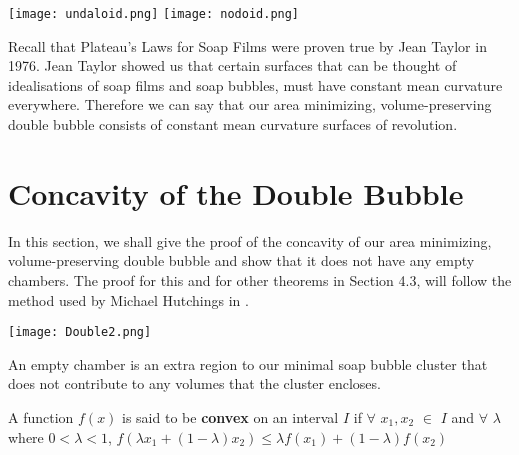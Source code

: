 \documentclass[a4paper,12pt]{report}
\begin{document}
\begin{center}
\texttt{[image: undaloid.png]}
\hspace{1cm}
\texttt{[image: nodoid.png]}
\vspace{-1cm}
\begin{multicols}{2}
\vspace{1cm}
\end{multicols}
\end{center}

Recall that Plateau's Laws for Soap Films were proven true by Jean Taylor in 1976. Jean Taylor showed us that certain surfaces that can be thought of idealisations of soap films and soap bubbles, must have constant mean curvature everywhere. Therefore we can say that our area minimizing, volume-preserving double bubble consists of constant mean curvature surfaces of revolution.

\section{Concavity of the Double Bubble}

In this section, we shall give the proof of  the concavity of our area minimizing, volume-preserving double bubble and show that it does not have any empty chambers. The proof for this and for other theorems in Section 4.3, will follow the method used by Michael Hutchings in \cite{hutchings}. 

\begin{center}
\texttt{[image: Double2.png]}
\end{center}

\begin{definition}
An empty chamber is an extra region to our minimal soap bubble cluster that does not contribute to any volumes that the cluster encloses.
\end{definition}

\begin{definition}
A function $f(x)$ is said to be \textbf{convex} on an interval $I$ if $\forall$ $x_{1},x_{2}$ $\in$ $I$ and $\forall$ $\lambda$ where $0 < \lambda < 1$, $f(\lambda x_{1} + (1-\lambda)x_{2}) \leq \lambda f(x_{1}) + (1-\lambda)f(x_{2})$
\end{definition}
\end{document}
